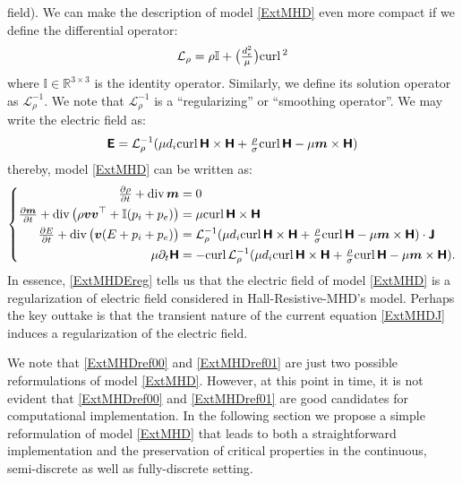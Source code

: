 \documentclass[preprint,1p]{elsarticle}
\begin{document}
field). We can make the description of model \eqref{ExtMHD} even more compact
if we define the differential operator:
\begin{align*}
 \mathcal{L}_{\rho} = \rho \mathbb{I}
 + \big(\tfrac{d_e^2}{\mu}\big) \text{curl} \, \mathbf{}^2
\end{align*}
where $\mathbb{I} \in \mathbb{R}^{3\times 3}$ is the identity operator.
Similarly, we define its solution operator as $\mathcal{L}_{\rho}^{-1}$. We
note that $\mathcal{L}_{\rho}^{-1}$ is a ``regularizing'' or ``smoothing
operator''. We may write the electric field as:
\begin{align}
\label{ExtMHDEreg}
\boldsymbol{\mathsf{E}} = \mathcal{L}_{\rho}^{-1} (\mu d_i \text{curl} \, \mathbf{}\boldsymbol{\mathsf{H}} \times \boldsymbol{\mathsf{H}}
+ \tfrac{\rho}{\sigma} \text{curl} \, \mathbf{}\boldsymbol{\mathsf{H}}
- \mu \boldsymbol{m} \times \boldsymbol{\mathsf{H}} )
\end{align}
thereby, model \eqref{ExtMHD} can be written as:
\begin{align}
\label{ExtMHDref01}
\left\{
\begin{aligned}
\tfrac{\partial \rho}{\partial t} + \diver{}\mom &= 0 \\
%
\tfrac{\partial \mom}{\partial t} + \diver{}
\big( \rho \vel\vel^\transp
+ \mathbb{I} (p_i + p_e) \big)
&=
\mu \curl{}\Hfield \times \Hfield \\
%
\tfrac{\partial \totme}{\partial t} + \diver{}\big( \vel (\totme + p_i +
p_e) \big)
&= \mathcal{L}_{\rho}^{-1} (\mu d_i \curl{}\Hfield \times \Hfield
+ \tfrac{\rho}{\conduct} \curl{}\Hfield
- \mu \mom \times \Hfield ) \cdot\current \\
%
\mu \partial_t \Hfield  &= - \curl{}\mathcal{L}_{\rho}^{-1} (\mu d_i
\curl{}\Hfield \times \Hfield
+ \tfrac{\rho}{\conduct} \curl{}\Hfield
- \mu \mom \times \Hfield ) .
\end{aligned}
\right.
\end{align}
In essence, \eqref{ExtMHDEreg} tells us that the electric field of
model \eqref{ExtMHD} is a regularization of electric
field considered in Hall-Resistive-MHD's model. Perhaps the key outtake is that
the transient nature of the current equation \eqref{ExtMHDJ} induces a
regularization of the electric field.

We note that \eqref{ExtMHDref00} and \eqref{ExtMHDref01} are just two
possible reformulations of model \eqref{ExtMHD}. However, at this point
in time, it is not evident that \eqref{ExtMHDref00} and \eqref{ExtMHDref01}
are good candidates for computational implementation. In the following section
we propose a simple reformulation of model \eqref{ExtMHD} that leads to
both a straightforward implementation and the preservation of critical
properties in the continuous, semi-discrete as well as fully-discrete setting.
\end{document}
